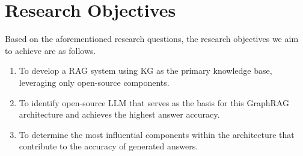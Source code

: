 \section{Research Objectives}
\label{sec:tujuan}
Based on the aforementioned research questions, the research objectives we aim to achieve are as follows.
\begin{enumerate}
    \item To develop a RAG system using KG as the primary knowledge base, leveraging only open-source components.
    \item To identify open-source LLM that serves as the basis for this GraphRAG architecture and achieves the highest answer accuracy.
    \item To determine the most influential components within the architecture that contribute to the accuracy of generated answers.
\end{enumerate}






